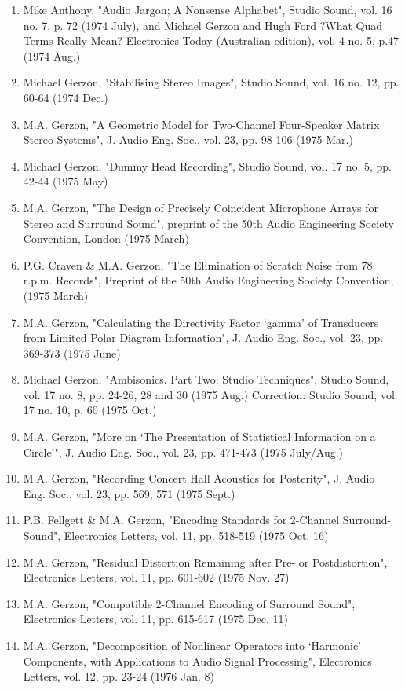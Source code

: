 \documentclass[9pt]{amsart}
\begin{document}
\begin{enumerate}
\item Mike Anthony, "Audio Jargon; A Nonsense Alphabet", Studio Sound, vol. 16 no. 7, p. 72 (1974 July), and Michael Gerzon and Hugh Ford ?What Quad Terms Really Mean? Electronics Today (Australian edition), vol. 4 no. 5, p.47 (1974 Aug.)
\item Michael Gerzon, "Stabilising Stereo Images", Studio Sound, vol. 16 no. 12, pp. 60-64 (1974 Dec.)
\item M.A. Gerzon, "A Geometric Model for Two-Channel Four-Speaker Matrix Stereo Systems", J. Audio Eng. Soc., vol. 23, pp. 98-106 (1975 Mar.)
\item Michael Gerzon, "Dummy Head Recording", Studio Sound, vol. 17 no. 5, pp. 42-44 (1975 May)
\item M.A. Gerzon, "The Design of Precisely Coincident Microphone Arrays for Stereo and Surround Sound", preprint of the 50th Audio Engineering Society Convention, London (1975 March)
\item P.G. Craven \& M.A. Gerzon, "The Elimination of Scratch Noise from 78 r.p.m. Records", Preprint of the 50th Audio Engineering Society Convention, (1975 March)
\item M.A. Gerzon, "Calculating the Directivity Factor `gamma' of Transducers from Limited Polar Diagram Information", J. Audio Eng. Soc., vol. 23, pp. 369-373 (1975 June)
\item Michael Gerzon, "Ambisonics. Part Two: Studio Techniques", Studio Sound, vol. 17 no. 8, pp. 24-26, 28 and 30 (1975 Aug.) Correction: Studio Sound, vol. 17 no. 10, p. 60 (1975 Oct.)
\item M.A. Gerzon, "More on `The Presentation of Statistical Information on a Circle'", J. Audio Eng. Soc., vol. 23, pp. 471-473 (1975 July/Aug.)
\item M.A. Gerzon, "Recording Concert Hall Acoustics for Posterity", J. Audio Eng. Soc., vol. 23, pp. 569, 571 (1975 Sept.)
\item P.B. Fellgett \& M.A. Gerzon, "Encoding Standards for 2-Channel Surround-Sound", Electronics Letters, vol. 11, pp. 518-519 (1975 Oct. 16)
\item M.A. Gerzon, "Residual Distortion Remaining after Pre- or Postdistortion", Electronics Letters, vol. 11, pp. 601-602 (1975 Nov. 27)
\item M.A. Gerzon, "Compatible 2-Channel Encoding of Surround Sound", Electronics Letters, vol. 11, pp. 615-617 (1975 Dec. 11)
\item M.A. Gerzon, "Decomposition of Nonlinear Operators into `Harmonic' Components, with Applications to Audio Signal Processing", Electronics Letters, vol. 12, pp. 23-24 (1976 Jan. 8)

\end{enumerate}
\end{document}
